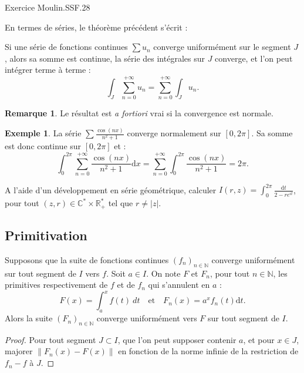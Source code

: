 \documentclass[french]{article}
\newcommand{\N}{\mathbb{N}}
\newcommand{\R}{\mathbb{R}}
\newcommand{\C}{\mathbb{C}}
\newcommand{\st}{^*}
\renewcommand{\d}{\text{d}}
\theoremstyle{plain}
\theoremstyle{definition}
\newtheorem*{ex}{Exemple}
\newtheorem*{rmq}{Remarque}
\theoremstyle{remark}
\begin{document}
Exercice Moulin.SSF.28

En termes de séries, le théorème précédent s'écrit :

\begin{thm}%
	Si une série de fonctions continues $\displaystyle\sum u_n$ converge uniformément sur le segment $J$, alors sa somme est continue, la série des intégrales sur $J$ converge, et l'on peut intégrer terme à terme :
	$$\int_J\sum_{n=0}^{+\infty}u_n=\sum_{n=0}^{+\infty}\int_J u_n.$$
\end{thm}

\begin{rmq}
	Le résultat est \textit{a fortiori} vrai si la convergence est normale.
\end{rmq}

\begin{ex}
	La série $\displaystyle\sum\frac{\cos(nx)}{n^2+1}$ converge normalement sur $[0,2\pi]$. Sa somme est donc continue sur $[0,2\pi]$ et :
	$$\int_{0}^{2\pi}\sum_{n=0}^{+\infty}\frac{\cos(nx)}{n^2+1}\d x=\sum_{n=0}^{+\infty}\int_{0}^{2\pi}\frac{\cos(nx)}{n^2+1}=2\pi.$$
\end{ex}

\begin{exo}
	A l'aide d'un développement en série géométrique, calculer $I(r,z)=\displaystyle\int_{0}^{2\pi}\frac{\d t}{2-re^{it}}$, pour tout $(z,r)\in\C\st\times\R_+\st$ tel que $r\ne \lvert z\rvert$.
\end{exo}

\subsection{Primitivation}

\begin{prop}%
	Supposons que la suite de fonctions continues $(f_n)_{n\in\N}$ converge uniformément sur tout segment de $I$ vers $f$. Soit $a\in I$. On note $F$ et $F_n$, pour tout $n\in\N$, les primitives respectivement de $f$ et de $f_n$ qui s'annulent en $a$ :
	$$F(x)=\int_{a}^{x}f(t)\ dt\quad\text{et}\quad F_n(x)={a}^{x}f_n(t)\d t.$$
	Alors la suite $(F_n)_{n\in\N}$ converge uniformément vers $F$ sur tout segment de $I$.
\end{prop}
\begin{proof}
	Pour tout segment $J\subset I$, que l'on peut supposer contenir $a$, et pour $x\in J$, majorer $\lVert F_n(x)-F(x)\rVert$ en fonction de la norme infinie de la restriction de $f_n-f$ à $J$.
\end{proof}
\end{document}
